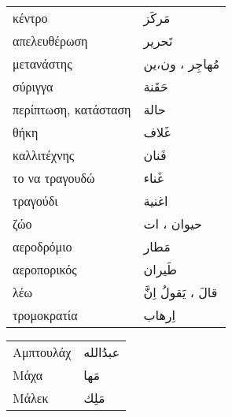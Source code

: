 \documentclass[twocolumn,a4paper]{article}
\newcommand{\ar}[1]{\textarabic{#1}}
\newcommand{\pl}{\raisebox{0.15ex}{\footnotesize ◍}}
\newcommand{\normpl}[1]{\ar{ #1، ات }}
\newcommand{\mfnormpl}[1]{\ar{ #1، ون،ين }}
\newcommand{\vrf}{\raisebox{0.15ex}{\footnotesize ◉}}
\newcommand{\mas}{\raisebox{0.15ex}{\footnotesize ◫}}
\begin{document}
\begin{mpsupertabular}{ P{0.5\textwidth} P{0.5\textwidth} }
κέντρο                       & \ar{ مَركَز } \\
απελευθέρωση                 & \ar{ تَحرير } \\
μετανάστης  \pl              & \mfnormpl{ مُهاجِر } \\
σύριγγα                      & \ar{ حَقَنة } \\
περίπτωση, κατάσταση         & \ar{ حالة } \\
θήκη                         & \ar{ غَلاف } \\
καλλιτέχνης                  & \ar{ فَنان } \\
το να τραγουδώ  \mas         & \ar{ غَناء } \\
τραγούδι                     & \ar{ اغنية } \\
ζώο \pl                      & \normpl{ حيوان } \\
αεροδρόμιο                   & \ar{ مَطار } \\
αεροπορικός                  & \ar{ طَيران } \\
λέω \vrf                     & \ar{ قالَ ، يَقولُ اِنَّ } \\
τρομοκρατία                  & \ar{ اِرهاب } \\


\end{mpsupertabular}


\clearpage

\begin{mpsupertabular}{ P{0.5\textwidth} P{0.5\textwidth} }
Αμπτουλάχ          & \ar{ عبدُالله } \\
Μάχα               & \ar{ مَها } \\
Μάλεκ              & \ar{ مَلِك } \\
\end{mpsupertabular}

\clearpage
\end{document}
